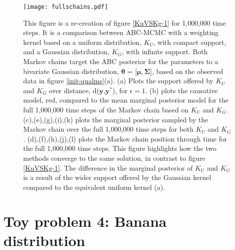 \begin{figure}[H]
	\centering
	\texttt{[image: fullschains.pdf]}
	\caption{ This figure is a re-creation of figure \ref{KuVSKg-1} for 1,000,000 time steps. It is a comparison between ABC-MCMC with a weighting kernel based on a uniform distribution, $K_U$, with compact support, and a Gaussian distribution, $K_G$, with infinite support. Both Markov chains target the ABC posterior for the parameters to a bivariate Gaussian distribution, $\bm{\theta}$ = [$\bm{\mu}, \bm{\Sigma}$], based on the observed data in figure \ref{init-qualms}(a). (a) Plots the support offered by $K_U$ and $K_G$ over distance, d($\bm{y}$,$\bm{y^*}$), for $\epsilon=1$. (b) plots the causative model, red, compared to the mean marginal posterior model for the full 1,000,000 time steps of the Markov chain based on $K_U$ and $K_G$. (c),(e),(g),(i),(k) plots the marginal posterior sampled by the Markov chain over the full 1,000,000 time steps for both $K_U$ and $K_G$. (d),(f),(h),(j),(l) plots the Markov chain position through time for the full 1,000,000 time steps. This figure highlights how the two methods converge to the same solution, in contrast to figure \ref{KuVSKg-1}. The difference in the marginal posterior of $K_U$ and $K_G$ is a result of the wider support offered by the Gaussian kernel compared to the equivalent uniform kernel (a).}
	\label{KuVSKg-2}
\end{figure} 

\section{Toy problem 4: Banana distribution}
\label{banana-section}

